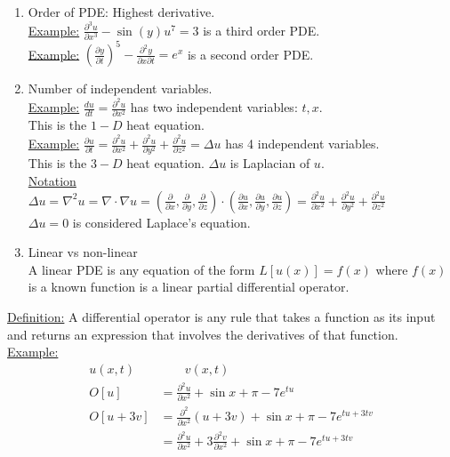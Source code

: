 \documentclass{article}
\newcommand{\grad}{\nabla}
\newcommand{\Ex}{\underline{Example:} }
\newcommand{\dfn}{\underline{Definition:} }
\begin{document}
\begin{enumerate}
  \item Order of PDE: Highest derivative.\\
  \Ex $\frac{\partial^3 u}{\partial x^3} - \sin(y) u^7 = 3$ is a third order PDE.\\
  \Ex $(\frac{\partial y}{\partial t})^5 - \frac{\partial^2y}{\partial x \partial t} = e^x$ is a second order PDE.
  \item Number of independent variables.\\
  \Ex $\frac{du}{dt} = \frac{\partial^2 u}{\partial x^2}$ has two independent variables: $t, x$.\\
  This is the $1-D$ heat equation.\\
  \Ex $\frac{\partial u}{\partial t} = \frac{\partial^2 u}{\partial x^2} + \frac{\partial^2 u}{\partial y^2} + \frac{\partial^2 u}{\partial z^2} = \Delta u$ has 4 independent variables.\\
  This is the $3-D$ heat equation. $\Delta u$ is Laplacian of $u$.\\
  \underline{Notation}\\
  $
  \Delta u =
  \grad^2 u =
  \grad \cdot \grad u =
  (\frac{\partial}{\partial x}, \frac{\partial}{\partial y}, \frac{\partial}{\partial z}) \cdot (\frac{\partial u}{\partial x}, \frac{\partial u}{\partial y}, \frac{\partial u}{\partial z}) =
  \frac{\partial^2 u}{\partial x^2} + \frac{\partial^2 u}{\partial y^2} + \frac{\partial^2 u}{\partial z^2}
  $\\
  $\Delta u = 0$ is considered Laplace's equation.
  \item Linear vs non-linear\\
  A linear PDE is any equation of the form $L[u(x)] = f(x)$ where $f(x)$ is a known function is a linear partial differential operator.
\end{enumerate}
\dfn A differential operator is any rule that takes a function as its input and returns an expression that involves the derivatives of that function.\\
\Ex
\begin{align}
  u(x, t) & \qquad v(x, t)\\
  O[u] & = \frac{\partial^2 u}{\partial x^2} + \sin x + \pi - 7e^{tu}\\
  O[u + 3v] & = \frac{\partial^2}{\partial x^2}(u + 3v) + \sin x + \pi - 7e^{tu + 3tv}\\
  & = \frac{\partial^2 u}{\partial x^2} + 3 \frac{\partial^2 v}{\partial x^2}+ \sin x + \pi - 7e^{tu + 3tv}
\end{align}
\end{document}
